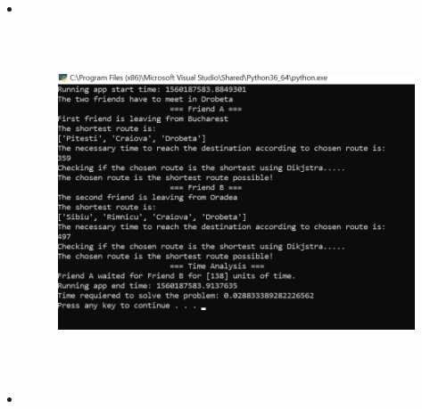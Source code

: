 \documentclass[12pt]{article}
\begin{document}
\begin{itemize}

	\item \  \par




\begin{figure}[H]
	\begin{Center}
		\includegraphics[width=5.61in,height=4.02in]{./media/image14.png}
	\end{Center}
\end{figure}



	\item \ \  \par





\end{itemize}
\end{document}
